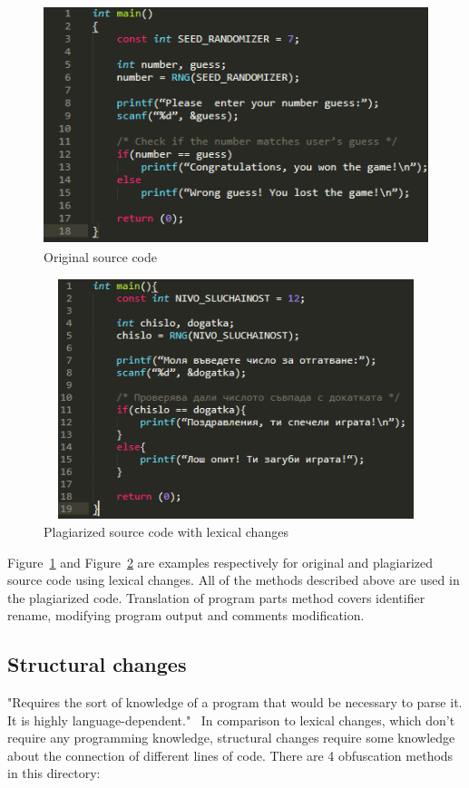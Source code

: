 \documentclass[12pt]{article}
\begin{document}
\begin{figure} [ht]
    \centering
    \includegraphics[width=12cm, height=7cm]{../images/sourceCodeLexical1.png}
    \caption{Original source code}
    \label{fig:sourceCodeLexical1}
\end{figure}

\begin{figure} [ht]
    \centering
    \includegraphics[width=12cm, height=7cm]{../images/sourceCodeLexical2.png}
    \caption{Plagiarized source code with lexical changes}
    \label{fig:sourceCodeLexical2}
\end{figure}

Figure~\ref{fig:sourceCodeLexical1} and Figure~\ref{fig:sourceCodeLexical2} are examples respectively for original and plagiarized source  code using lexical changes. All of the methods described above are used in the plagiarized code. Translation of program parts method covers identifier rename, modifying program output and comments modification.



\subsection{Structural changes} \label{sec:Structural changes}
"Requires the sort of knowledge of a program that would be necessary to parse it. It is highly language-dependent."~\cite{joyUndLuck} In comparison to lexical changes, which don't require any programming knowledge, structural changes require some knowledge about the connection of different lines of code. There are 4 obfuscation methods in this directory:
\end{document}
